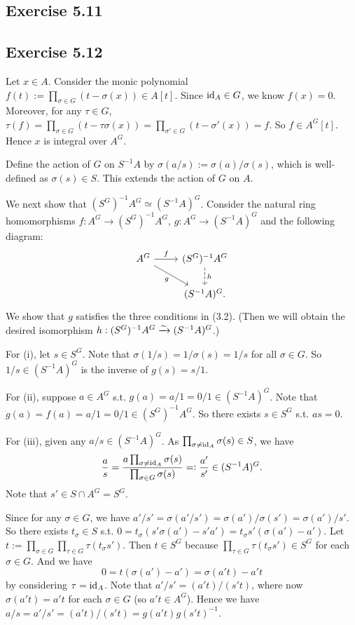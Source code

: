 \documentclass[../A&M.tex]{subfiles}
\begin{document}
\subsection*{Exercise 5.11}

\subsection*{Exercise 5.12}

Let $x\in A$. Consider the monic polynomial $f(t):= \prod_{\sigma \in G} (t - \sigma(x)) \in A[t]$. Since $\operatorname{id}_A \in G$, we know $f(x)=0$. Moreover, for any $\tau\in G$, $\tau(f) = \prod_{\sigma \in G} (t - \tau\sigma(x)) = \prod_{\sigma' \in G} (t - \sigma'(x)) = f$. So $f\in A^G[t]$. Hence $x$ is integral over $A^G$.

Define the action of $G$ on $S^{-1}A$ by $\sigma(a/s) := \sigma(a)/\sigma(s)$, which is well-defined as $\sigma(s) \in S$. This extends the action of $G$ on $A$.

We next show that $(S^G)^{-1}A^G \simeq (S^{-1}A)^G$. Consider the natural ring homomorphisms $f:A^G \to (S^G)^{-1}A^G$, $g:A^G \to (S^{-1}A)^G$ and the following diagram:
$$
\begin{tikzcd}
  A^G \arrow[r, "f"] \arrow[dr, "g"'] & (S^G)^{-1}A^G \arrow[d, dashrightarrow, "h"]   \\
										& (S^{-1}A)^G.
\end{tikzcd}
$$
We show that $g$ satisfies the three conditions in (3.2). (Then we will obtain the desired isomorphism $h: (S^G)^{-1}A^G  \xrightarrow{\sim} (S^{-1}A)^G$.)

For (i), let $s \in S^G$. Note that $\sigma(1/s) = 1/\sigma(s) = 1/s$ for all $\sigma\in G$. So $1/s \in (S^{-1}A)^G$ is the inverse of $g(s) = s/1$.

For (ii), suppose $a\in A^G$ s.t. $g(a) = a/1 = 0/1 \in (S^{-1}A)^G$. Note that $g(a) = f(a) = a/1 = 0/1 \in (S^G)^{-1}A^G$. So there exists $s \in S^G$ s.t. $as = 0$.

For (iii), given any $a/s \in (S^{-1}A)^G$. As $\prod_{\sigma \neq \operatorname{id}_A} \sigma(s) \in S$, we have
$$
\frac{a}{s}
= \frac{a \prod_{\sigma \neq \operatorname{id}_A} \sigma(s)}{\prod_{\sigma \in G} \sigma(s)}
=: \frac{a'}{s'} \in (S^{-1}A)^G.
$$
Note that $s' \in S \cap A^G = S^G$.

Since for any $\sigma\in G$, we have $a'/s' = \sigma(a'/s') = \sigma(a')/\sigma(s') = \sigma(a')/s'$. So there exists $t_\sigma \in S$ s.t. $0 = t_\sigma(s'\sigma(a') - s'a') =t_\sigma s' (\sigma(a')-a')$. Let $t:=\prod_{\sigma \in G} \prod_{\tau \in G} \tau(t_\sigma s')$. Then $t \in S^G$ because $\prod_{\tau \in G} \tau(t_\sigma s') \in S^G$ for each $\sigma \in G$. And we have
$$
0 = t(\sigma(a')-a') = \sigma(a't) - a't
$$
by considering $\tau=\operatorname{id}_A$. Note that $a'/s' = (a't)/(s't)$, where now $\sigma(a't) = a't$ for each $\sigma \in G$ (so $a't \in A^G$). Hence we have $a/s = a'/s' = (a't)/(s't) = g(a't)g(s't)^{-1}$.
\end{document}
